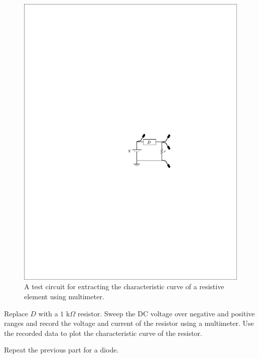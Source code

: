 \documentclass[11pt]{article}
\begin{document}

\begin{question}


    \begin{figure}[H]
        \centering
        \includegraphics[scale=1.2,angle=0]{Fig/cir2.pdf}
        \caption{A test circuit for extracting the characteristic curve of a resistive element using multimeter.} \label{fig:cir2}
    \end{figure}

    \begin{subquestion}{Replace $D$ with a $1$ k$\Omega$ resistor. Sweep the DC voltage over negative and positive ranges and record the voltage and current of the resistor using a multimeter. Use the recorded data to plot the characteristic curve of the resistor.}
        \answer{}
    \end{subquestion}

    \begin{subquestion}{Repeat the previous part for a diode.}
        \answer{}
    \end{subquestion}


\end{question}
\end{document}
